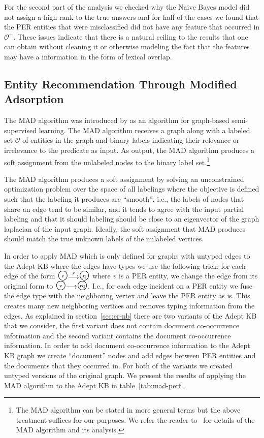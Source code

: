 \documentclass[paper=a4,fontsize=11pt]{scrartcl}
\newcommand{\ie}{i.e.,\xspace}
\newcommand{\Ie}{I.e.,\xspace}
\newcommand{\secref}[1]{section~\ref{#1}}
\newcommand{\tabref}[1]{table~\ref{#1}}
\numberwithin{equation}{section}    %
\numberwithin{figure}{section}      %
\numberwithin{table}{section}       %
\def\overstrike#1#2{{\setbox0\hbox{$#2$}\hbox to \wd0{\hss$#1$\hss}\kern-\wd0\box0}}
\newcommand{\bigstaten}[1]{\overstrike{\protect\raisebox{1pt}{\mbox{\scriptsize #1}}}{\mbox{\Large $\bigcirc$}}}
\newcommand{\shortarc}[1]{\protect\raisebox{-1pt}{$\stackrel{#1}{\longrightarrow}$}}
\begin{document}
For the second part of the analysis we checked why the Naive Bayes model did
not assign a high rank
to the true answers and for half of the cases we found that the \textsc{PER}
entities that were misclassified did not have any feature that occurred in $\mathcal{O}^{+}$.
These issues indicate that there is a natural ceiling to the results that one can obtain without
cleaning it or otherwise modeling the fact that the features may have a information in the form of lexical overlap.

\subsection{Entity Recommendation Through Modified Adsorption}
\label{sec:er-lp}
The MAD algorithm was introduced by \citep{talukdar2009new} as an algorithm
for graph-based semi-supervised learning. The MAD algorithm receives a graph along with
a labeled set $\mathcal{O}$ of entities in the graph and binary labels indicating
their relevance or irrelevance to the predicate as input. As output, the MAD algorithm
produces a soft assignment from the unlabeled nodes to the binary label set.\footnote{The MAD algorithm can be stated in more general terms but the above treatment suffices for our purposes. We refer the reader to~\citep{talukdar2009new} for details of the MAD algorithm
and its analysis.}

The MAD algorithm produces a soft assignment by solving an unconstrained
optimization problem over the space of all labelings where the objective
is defined such that the labeling it produces are ``smooth'', \ie the
labels of nodes that share an edge tend to be similar, and it tends to agree with
the input partial labeling and that it should labeling should be close to an
eigenvector of the graph laplacian of the input graph.
Ideally, the soft assignment that MAD produces should match the true
unknown labels of the unlabeled vertices.

In order to apply MAD which is only defined for graphs with untyped edges to the
Adept KB where the edges have types we use the following trick:
for each edge of the form $\bigstaten{v} \shortarc{r} \bigstaten{q}$ where $v$
is a \textsc{PER} entity, we change the edge from its original form to
$\bigstaten{v} \shortarc{} \bigstaten{rq}$. \Ie for each edge incident on a
\textsc{PER} entity we fuse the edge type with the neighboring vertex and leave
the \textsc{PER} entity as is. This creates many new neighboring vertices and
removes typing information from the edges.
As explained in \secref{sec:er-nb} there are two variants of the Adept KB that
we consider, the first variant does not contain document co-occurrence
information and the second variant contains the document co-occurrence
information. In order to add document co-occurrence information to the Adept KB
graph we create ``document'' nodes and add edges between \textsc{PER} entities
and the documents that they occurred in. For both of the variants we created
untyped versions of the original graph. We present the results of applying the
MAD algorithm to the Adept KB in \tabref{tab:mad-perf}.
\end{document}
